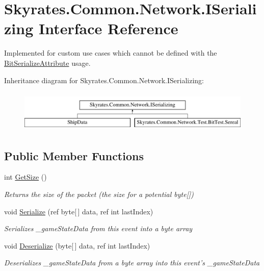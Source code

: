 \hypertarget{interface_skyrates_1_1_common_1_1_network_1_1_i_serializing}{\section{Skyrates.\-Common.\-Network.\-I\-Serializing Interface Reference}
\label{interface_skyrates_1_1_common_1_1_network_1_1_i_serializing}
}


Implemented for custom use cases which cannot be defined with the \hyperlink{class_skyrates_1_1_common_1_1_network_1_1_bit_serialize_attribute}{Bit\-Serialize\-Attribute} usage.  


Inheritance diagram for Skyrates.\-Common.\-Network.\-I\-Serializing\-:\begin{figure}[H]
\begin{center}
\leavevmode
\includegraphics[height=2.000000cm]{interface_skyrates_1_1_common_1_1_network_1_1_i_serializing}
\end{center}
\end{figure}
\subsection*{Public Member Functions}
\begin{DoxyCompactItemize}
\item 
int \hyperlink{interface_skyrates_1_1_common_1_1_network_1_1_i_serializing_a32fb93f3d40a5daec876031ae9406215}{Get\-Size} ()
\begin{DoxyCompactList}\small\item\em Returns the size of the packet (the size for a potential byte\mbox{[}\mbox{]}) \end{DoxyCompactList}\item 
void \hyperlink{interface_skyrates_1_1_common_1_1_network_1_1_i_serializing_a1433635010dc809984bb621d857f9489}{Serialize} (ref byte\mbox{[}$\,$\mbox{]} data, ref int last\-Index)
\begin{DoxyCompactList}\small\item\em Serializes \-\_\-game\-State\-Data from this event into a byte array \end{DoxyCompactList}\item 
void \hyperlink{interface_skyrates_1_1_common_1_1_network_1_1_i_serializing_a7848a41bbac6504e8be9bec00be3608d}{Deserialize} (byte\mbox{[}$\,$\mbox{]} data, ref int last\-Index)
\begin{DoxyCompactList}\small\item\em Deserializes \-\_\-game\-State\-Data from a byte array into this event's \-\_\-game\-State\-Data \end{DoxyCompactList}\end{DoxyCompactItemize}


